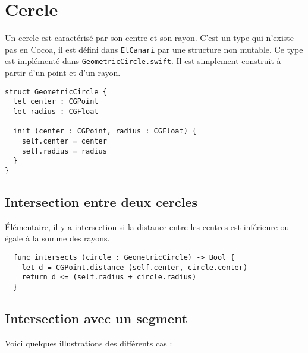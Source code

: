 

\chapter{Cercle}

Un cercle est caractérisé par son centre et son rayon. C'est un type qui n'existe pas en Cocoa, il est défini dans \texttt{ElCanari} par une structure non mutable. Ce type est implémenté dans \texttt{GeometricCircle.swift}. Il est simplement construit à partir d'un point et d'un rayon.

\begin{lstlisting}
struct GeometricCircle {
  let center : CGPoint
  let radius : CGFloat

  init (center : CGPoint, radius : CGFloat) {
    self.center = center
    self.radius = radius
  }
}
\end{lstlisting}





\section{Intersection entre deux cercles}

Élémentaire, il y a intersection si la distance entre les centres est inférieure ou égale à la somme des rayons.


\begin{lstlisting}
  func intersects (circle : GeometricCircle) -> Bool {
    let d = CGPoint.distance (self.center, circle.center)
    return d <= (self.radius + circle.radius)
  }
\end{lstlisting}






\section{Intersection avec un segment}

Voici quelques illustrations des différents cas :
\begin{center}
\end{center}

